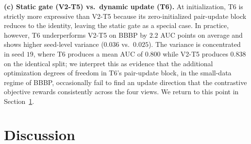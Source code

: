 \documentclass[conference]{IEEEtran}
\begin{document}
\noindent\textbf{(c) Static gate (V2-T5) vs.\ dynamic update (T6).}
At initialization, T6 is strictly more expressive than V2-T5 because its zero-initialized pair-update block reduces to the identity, leaving the static gate as a special case. In practice, however, T6 underperforms V2-T5 on BBBP by $2.2$ AUC points on average and shows higher seed-level variance ($0.036$ vs.\ $0.025$). The variance is concentrated in seed $19$, where T6 produces a mean AUC of $0.800$ while V2-T5 produces $0.838$ on the identical split; we interpret this as evidence that the additional optimization degrees of freedom in T6's pair-update block, in the small-data regime of BBBP, occasionally fail to find an update direction that the contrastive objective rewards consistently across the four views. We return to this point in Section~\ref{sec:discussion}.

\section{Discussion}
\label{sec:discussion}
\end{document}
